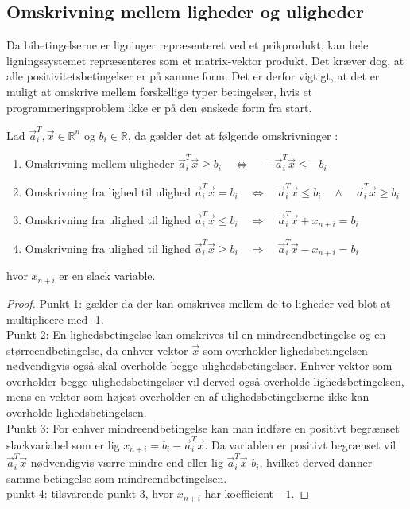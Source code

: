 \subsection{Omskrivning mellem ligheder og uligheder}
Da bibetingelserne er ligninger repræsenteret ved et prikprodukt, kan hele ligningssystemet repræsenteres som et matrix-vektor produkt. Det kræver dog, at alle positivitetsbetingelser er på samme form. 
Det er derfor vigtigt, at det er muligt at omskrive mellem forskellige typer betingelser, hvis et programmeringsproblem ikke er på den ønskede form fra start.

\begin{stn}
Lad $\vec{a}_i^T,\vec{x} \in \mathds{R}^n$ og $b_i \in \mathds{R}$, da gælder det at følgende omskrivninger :
\begin{enumerate}
\item Omskrivning mellem uligheder \qquad \quad $\vec{a}_i^T\vec{x} \geq b_i \quad \Leftrightarrow \quad -\vec{a}_i^T\vec{x} \leq -b_i$
\item Omskrivning fra lighed til ulighed \qquad  $\vec{a}_i^T\vec{x} = b_i \quad \Leftrightarrow  \quad  \vec{a}_i^T\vec{x} \leq b_i \quad \wedge \quad  \vec{a}_i^T\vec{x} \geq b_i$
\item Omskrivning fra ulighed til lighed \qquad $\vec{a}_i^T \vec{x}  \leq b_i \quad \Rightarrow \quad  \vec{a}_i^T \vec{x}  +  x_{n+i}  = b_i$
\item Omskrivning fra ulighed til lighed \qquad $\vec{a}_i^T \vec{x}  \geq b_i \quad \Rightarrow \quad  \vec{a}_i^T \vec{x}  - x_{n+i}  = b_i$
\end{enumerate}
hvor $x_{n+i}$ er en slack variable.
\label{stn:omskr_ligulig} 
\end{stn}

\begin{proof}
Punkt 1: gælder da der kan omskrives mellem de to ligheder ved blot at multiplicere med -1.\\
Punkt 2: En lighedsbetingelse kan omskrives til en mindreendbetingelse og en størreendbetingelse, da enhver vektor $\vec{x}$ som overholder lighedsbetingelsen nødvendigvis også skal overholde begge ulighedsbetingelser. Enhver vektor som overholder begge ulighedsbetingelser vil derved også overholde lighedsbetingelsen, mens en vektor som højest overholder en af ulighedsbetingelserne ikke kan overholde lighedsbetingelsen.\\
Punkt 3: For enhver mindreendbetingelse kan man indføre en positivt begrænset slackvariabel som er lig $x_{n+i}  = b_i - \vec{a}_i^T \vec{x}$. Da variablen er positivt begrænset vil $\vec{a}_i^T \vec{x}$ nødvendigvis værre mindre end eller lig $\vec{a}_i^T \vec{x}$ $b_i$, hvilket derved danner samme betingelse som mindreendbetingelsen.\\
punkt 4: tilsvarende punkt 3, hvor $x_{n+i}$ har koefficient $-1$.
\end{proof}

